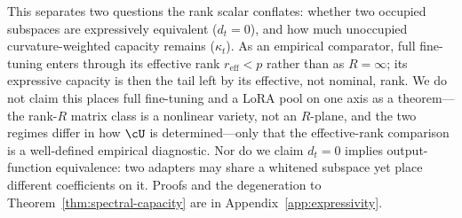 This separates two questions the rank scalar conflates: whether two occupied
subspaces are expressively equivalent ($d_t=0$), and how much unoccupied
curvature-weighted capacity remains ($\kappa_t$). As an empirical comparator,
full fine-tuning enters through its effective rank $r_{\mathrm{eff}}<p$ rather
than as $R=\infty$; its expressive capacity is then the tail left by its
effective, not nominal, rank. We do not claim this places full fine-tuning and a
LoRA pool on one axis as a theorem---the rank-$R$ matrix class is a nonlinear
variety, not an $R$-plane, and the two regimes differ in how $\cU$ is
determined---only that the effective-rank comparison is a well-defined empirical
diagnostic. Nor do we claim $d_t=0$ implies output-function equivalence: two
adapters may share a whitened subspace yet place different coefficients on it.
Proofs and the degeneration to Theorem~\ref{thm:spectral-capacity} are in
Appendix~\ref{app:expressivity}.
